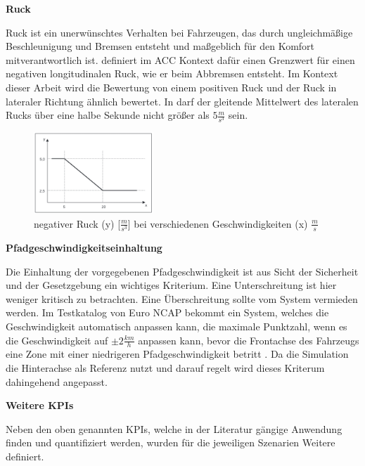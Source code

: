 \bigskip\noindent\textbf{Ruck}

\noindent Ruck ist ein unerwünschtes Verhalten bei Fahrzeugen, das durch ungleichmäßige Beschleunigung und Bremsen entsteht und maßgeblich für den Komfort mitverantwortlich ist. \cite{ISO15622} definiert im ACC Kontext dafür einen Grenzwert für einen negativen longitudinalen Ruck, wie er beim Abbremsen entsteht. Im Kontext dieser Arbeit wird die Bewertung von einem positiven Ruck und der Ruck in lateraler Richtung ähnlich bewertet. In \cite{UNECE_R79} darf der gleitende Mittelwert des lateralen Rucks über eine halbe Sekunde nicht größer als $5\frac{m}{s^{3}}$ sein.
\begin{figure}
    \centering
    \includegraphics[width=0.4\textwidth]{figures/3_Implementierung/max_neg_jerk.png}
    \caption{negativer Ruck (y) [$\frac{m}{s^{3}}$] bei verschiedenen Geschwindigkeiten (x) $\frac{m}{s}$ \cite{ISO15622}}
    \label{fig:neg_jerk}
\end{figure}

\bigskip\noindent\textbf{Pfadgeschwindigkeitseinhaltung}

\noindent Die Einhaltung der vorgegebenen Pfadgeschwindigkeit ist aus Sicht der Sicherheit und der Gesetzgebung ein wichtiges Kriterium. Eine Unterschreitung ist hier weniger kritisch zu betrachten. Eine Überschreitung sollte vom System vermieden werden. Im Testkatalog von Euro NCAP bekommt ein System, welches die Geschwindigkeit automatisch anpassen kann, die maximale Punktzahl, wenn es die Geschwindigkeit auf $\pm2\frac{km}{h}$ anpassen kann, bevor die Frontachse des Fahrzeugs eine Zone mit einer niedrigeren Pfadgeschwindigkeit betritt \cite{NCAP2024}. Da die Simulation die Hinterachse als Referenz nutzt und darauf regelt wird dieses Kriterum dahingehend angepasst.

\bigskip\noindent\textbf{Weitere KPIs}

\noindent Neben den oben genannten KPIs, welche in der Literatur gängige Anwendung finden und quantifiziert werden, wurden für die jeweiligen Szenarien Weitere definiert.

